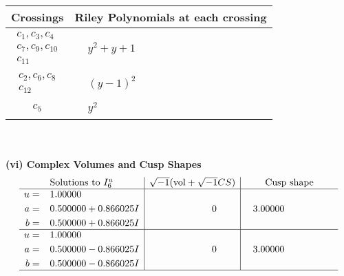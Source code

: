 \documentclass[1p]{elsarticle_modified}
\theoremstyle{definition}
\newcommand{\I}{\sqrt{-1}}
\begin{document}
\begin{tabular}{m{50pt}|m{274pt}}
Crossings & \hspace{64pt}Riley Polynomials at each crossing \\
\hline $$\begin{aligned}c_{1},c_{3},c_{4}\\c_{7},c_{9},c_{10}\\c_{11}\end{aligned}$$&$\begin{aligned}
&y^2+y+1
\end{aligned}$\\
\hline $$\begin{aligned}c_{2},c_{6},c_{8}\\c_{12}\end{aligned}$$&$\begin{aligned}
&(y-1)^2
\end{aligned}$\\
\hline $$\begin{aligned}c_{5}\end{aligned}$$&$\begin{aligned}
&y^2
\end{aligned}$\\
\hline
\end{tabular}\\~\\
\newpage\flushleft \textbf{(vi) Complex Volumes and Cusp Shapes}
$$\begin{array}{c|c|c}  
\text{Solutions to }I^u_{6}& \I (\text{vol} + \sqrt{-1}CS) & \text{Cusp shape}\\
 \hline 
\begin{aligned}
u &= \phantom{-}1.00000\phantom{ +0.000000I} \\
a &= \phantom{-}0.500000 + 0.866025 I \\
b &= \phantom{-}0.500000 + 0.866025 I\end{aligned}
 & \phantom{-0.000000 } 0 & \phantom{-}3.00000\phantom{ +0.000000I} \\ \hline\begin{aligned}
u &= \phantom{-}1.00000\phantom{ +0.000000I} \\
a &= \phantom{-}0.500000 - 0.866025 I \\
b &= \phantom{-}0.500000 - 0.866025 I\end{aligned}
 & \phantom{-0.000000 } 0 & \phantom{-}3.00000\phantom{ +0.000000I}\\
 \hline 
 \end{array}$$\newpage\newpage\renewcommand{\arraystretch}{1}
\end{document}
